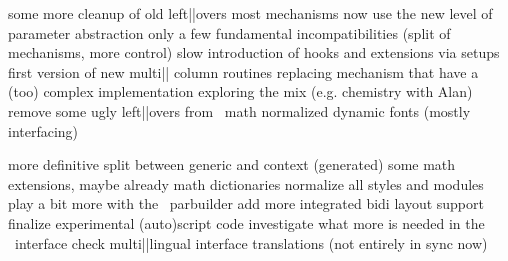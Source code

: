 

\definecolor[maincolor] [darkgray]
\definecolor[othercolor][r=.3,b=.3]


\startdocument
  [title={Bits and pieces:\\\\ConTeXt\\MetaPost\\Lua and more},
   subtitle={Hans Hagen\\EuroBacho\TeX\\May 2013}]

\StartSteps

\starttopic[title={ConTeXt\\recently done}]

    \startitemize
        \startitem some more cleanup of old left||overs \FlushStep \stopitem
        \startitem most mechanisms now use the new level of parameter abstraction \FlushStep \stopitem
        \startitem only a few fundamental incompatibilities (split of mechanisms, more control) \FlushStep \stopitem
        \startitem slow introduction of hooks and extensions via setups \FlushStep \stopitem
        \startitem first version of new multi|| column routines \FlushStep \stopitem
        \startitem replacing mechanism that have a (too) complex implementation \FlushStep \stopitem
        \startitem exploring the mix (e.g. chemistry with Alan) \FlushStep \stopitem
        \startitem remove some ugly left||overs from \MKII\ math \FlushStep \stopitem
        \startitem normalized dynamic fonts (mostly interfacing) \FlushStep \stopitem
    \stopitemize

\stoptopic

\StopSteps

\StartSteps

\starttopic[title={ConTeXt\\next on the todo list}]

    \startitemize
        \startitem more definitive split between generic and context (generated) \FlushStep \stopitem
        \startitem some math extensions, maybe already math dictionaries \FlushStep \stopitem
        \startitem normalize all styles and modules \FlushStep \stopitem
        \startitem play a bit more with the \LUA\ parbuilder \FlushStep \stopitem
        \startitem add more integrated bidi layout support \FlushStep \stopitem
        \startitem finalize experimental (auto)script code \FlushStep \stopitem
        \startitem investigate what more is needed in the \CLD\ interface \FlushStep \stopitem
        \startitem check multi||lingual interface translations (not entirely in sync now) \FlushStep \stopitem
    \stopitemize

